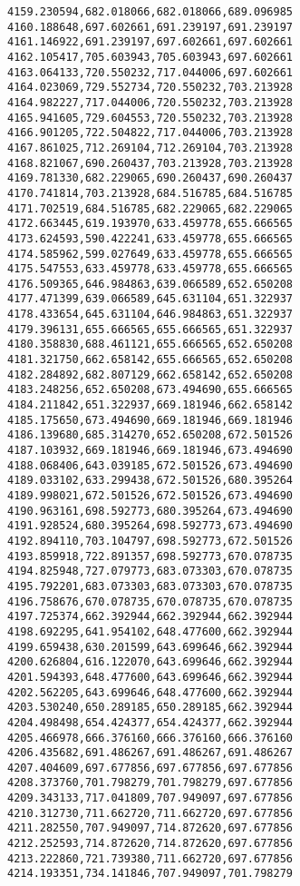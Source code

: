 \documentclass[11pt]{article}
\begin{document}
\begin{Verbatim}[commandchars=\\\{\}]
4159.230594,682.018066,682.018066,689.096985
4160.188648,697.602661,691.239197,691.239197
4161.146922,691.239197,697.602661,697.602661
4162.105417,705.603943,705.603943,697.602661
4163.064133,720.550232,717.044006,697.602661
4164.023069,729.552734,720.550232,703.213928
4164.982227,717.044006,720.550232,703.213928
4165.941605,729.604553,720.550232,703.213928
4166.901205,722.504822,717.044006,703.213928
4167.861025,712.269104,712.269104,703.213928
4168.821067,690.260437,703.213928,703.213928
4169.781330,682.229065,690.260437,690.260437
4170.741814,703.213928,684.516785,684.516785
4171.702519,684.516785,682.229065,682.229065
4172.663445,619.193970,633.459778,655.666565
4173.624593,590.422241,633.459778,655.666565
4174.585962,599.027649,633.459778,655.666565
4175.547553,633.459778,633.459778,655.666565
4176.509365,646.984863,639.066589,652.650208
4177.471399,639.066589,645.631104,651.322937
4178.433654,645.631104,646.984863,651.322937
4179.396131,655.666565,655.666565,651.322937
4180.358830,688.461121,655.666565,652.650208
4181.321750,662.658142,655.666565,652.650208
4182.284892,682.807129,662.658142,652.650208
4183.248256,652.650208,673.494690,655.666565
4184.211842,651.322937,669.181946,662.658142
4185.175650,673.494690,669.181946,669.181946
4186.139680,685.314270,652.650208,672.501526
4187.103932,669.181946,669.181946,673.494690
4188.068406,643.039185,672.501526,673.494690
4189.033102,633.299438,672.501526,680.395264
4189.998021,672.501526,672.501526,673.494690
4190.963161,698.592773,680.395264,673.494690
4191.928524,680.395264,698.592773,673.494690
4192.894110,703.104797,698.592773,672.501526
4193.859918,722.891357,698.592773,670.078735
4194.825948,727.079773,683.073303,670.078735
4195.792201,683.073303,683.073303,670.078735
4196.758676,670.078735,670.078735,670.078735
4197.725374,662.392944,662.392944,662.392944
4198.692295,641.954102,648.477600,662.392944
4199.659438,630.201599,643.699646,662.392944
4200.626804,616.122070,643.699646,662.392944
4201.594393,648.477600,643.699646,662.392944
4202.562205,643.699646,648.477600,662.392944
4203.530240,650.289185,650.289185,662.392944
4204.498498,654.424377,654.424377,662.392944
4205.466978,666.376160,666.376160,666.376160
4206.435682,691.486267,691.486267,691.486267
4207.404609,697.677856,697.677856,697.677856
4208.373760,701.798279,701.798279,697.677856
4209.343133,717.041809,707.949097,697.677856
4210.312730,711.662720,711.662720,697.677856
4211.282550,707.949097,714.872620,697.677856
4212.252593,714.872620,714.872620,697.677856
4213.222860,721.739380,711.662720,697.677856
4214.193351,734.141846,707.949097,701.798279

\end{Verbatim}
\end{document}
